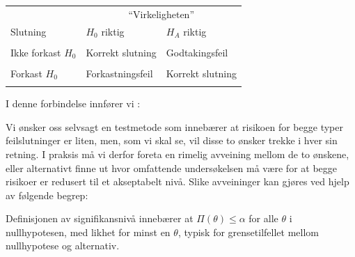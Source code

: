 \begin{center}
\begin{tabular}{|l|ll|} \hline 
                           & \multicolumn{2}{c|}{``Virkeligheten''} \\
Slutning                   & $H_0$ riktig & $H_A$ riktig \\ \hline
                   &                  &     \\
Ikke forkast $H_0$ & Korrekt slutning & Godtakingsfeil \\
                   &                  &       \\
Forkast $H_0$      & Forkastningsfeil & Korrekt slutning \\
                   &                  &               \\ \hline
\end{tabular}
\end{center}

\noindent I denne forbindelse innfører vi :
\begin{center}  \end{center}

\noindent Vi ønsker oss selvsagt en testmetode som innebærer at
 risikoen for begge typer feilslutninger er liten, men, som vi skal se, vil
disse to ønsker trekke i hver sin retning. I praksis må vi derfor
foreta en rimelig avveining mellom de to ønskene, eller alternativt
finne ut hvor omfattende undersøkelsen må være for at begge
risikoer er redusert til et akseptabelt nivå. Slike avveininger kan
gjøres ved hjelp av følgende begrep:
 
\begin{center}  \end{center}
Definisjonen av signifikansnivå innebærer at
$\Pi (\theta ) \leq \alpha $ for alle $\theta$ i nullhypotesen, med
likhet for minst en $\theta$, typisk for grensetilfellet mellom nullhypotese
og alternativ.

